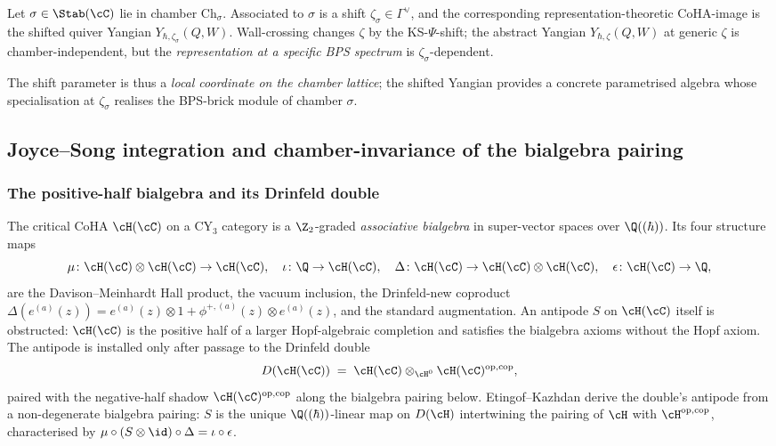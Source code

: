 \begin{theorem}
 \label{thm:shifted-yangian-chambers}
 Let $\sigma \in \Stab(\cC)$ lie in chamber $\mathrm{Ch}_\sigma$. Associated to
 $\sigma$ is a shift $\zeta_\sigma \in \Gamma^\vee$, and the corresponding
 representation-theoretic CoHA-image is the shifted quiver Yangian
 $Y_{\hbar, \zeta_\sigma}(Q, W)$. Wall-crossing changes $\zeta$ by the
 KS-$\Psi$-shift; the abstract Yangian
 $Y_{\hbar, \zeta}(Q, W)$ at generic $\zeta$ is chamber-independent, but
 the \emph{representation at a specific BPS spectrum} is
 $\zeta_\sigma$-dependent.
\end{theorem}

The shift parameter is thus a \emph{local coordinate on the chamber lattice};
the shifted Yangian provides a concrete parametrised algebra whose specialisation
at $\zeta_\sigma$ realises the BPS-brick module of chamber $\sigma$.

\subsection{Joyce--Song integration and chamber-invariance of the bialgebra pairing}
\label{sec:js-hopf-chamber-independence}

\subsubsection{The positive-half bialgebra and its Drinfeld double}
\label{subsec:bialgebra-not-hopf}

The critical CoHA $\cH(\cC)$ on a CY$_3$ category is a $\Z_2$-graded
\emph{associative bialgebra} in super-vector spaces over $\Q((\hbar))$. Its
four structure maps
\[
 \mu \colon \cH(\cC) \otimes \cH(\cC) \to \cH(\cC),
 \quad
 \iota \colon \Q \to \cH(\cC),
 \quad
 \Delta \colon \cH(\cC) \to \cH(\cC) \otimes \cH(\cC),
 \quad
 \epsilon \colon \cH(\cC) \to \Q,
\]
are the Davison--Meinhardt Hall product, the vacuum inclusion, the
Drinfeld-new coproduct
$\Delta(e^{(a)}(z)) = e^{(a)}(z) \otimes 1 + \phi^{+,(a)}(z) \otimes e^{(a)}(z)$,
and the standard augmentation. An antipode $S$ on $\cH(\cC)$ itself is
obstructed: $\cH(\cC)$ is the positive half of a larger Hopf-algebraic
completion and satisfies the bialgebra axioms without the Hopf axiom.
The antipode is installed only after passage to the Drinfeld double
\[
 D(\cH(\cC)) \;=\; \cH(\cC) \otimes_{\cH^0} \cH(\cC)^{\mathrm{op, cop}},
\]
paired with the negative-half shadow $\cH(\cC)^{\mathrm{op, cop}}$ along
the bialgebra pairing below. Etingof--Kazhdan
\cite[Prop.~3.4]{EtingofKazhdan1996} derive the double's antipode from
a non-degenerate bialgebra pairing: $S$ is the unique $\Q((\hbar))$-linear
map on $D(\cH)$ intertwining the pairing of $\cH$ with
$\cH^{\mathrm{op,cop}}$, characterised by
$\mu \circ (S \otimes \id) \circ \Delta = \iota \circ \epsilon$.

